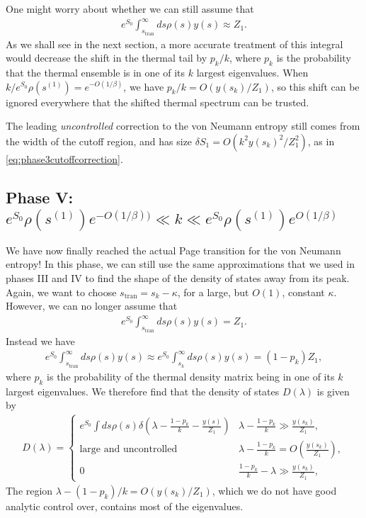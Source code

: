 \documentclass[11pt]{article}
\newcommand{\stran}{s_{\text{tran}}}
\newcommand{\smax}{s_k}
\numberwithin{equation}{section}
\begin{document}
One might worry about whether we can still assume that
\begin{align}
e^{S_0} \int_{\stran}^\infty ds \rho(s) y(s) \approx Z_1.
\end{align}
As we shall see in the next section, a more accurate treatment of this integral would decrease the shift in the thermal tail by $p_k/ k$, where $p_k$ is the probability that the thermal ensemble is in one of its $k$ largest eigenvalues. When $k/e^{S_0} \rho( s^{(1)}) = e^{-O(1/\beta)}$, we have $p_k/k = O( y(\smax)/Z_1)$, so this shift can be ignored everywhere that the shifted thermal spectrum can be trusted.

The leading \emph{uncontrolled} correction to the von Neumann entropy still comes from the width of the cutoff region, and has size $\delta S_1 =  O(k^2 y(\smax)^2/Z_1^2)$, as in \eqref{eq:phase3cutoffcorrection}.

\subsection*{Phase V: $e^{S_0} \rho( s^{(1)})e^{-O(1/\beta))} \ll k \ll e^{S_0} \rho( s^{(1)}) e^{O(1/\beta)}$}
We have now finally reached the actual Page transition for the von Neumann entropy! In this phase, we can still use the same approximations that we used in phases III and IV to find the shape of the density of states away from its peak. Again, we want to choose $\stran = \smax - \kappa$, for a large, but $O(1)$, constant $\kappa$. However, we can no longer assume that
\begin{align}
e^{S_0} \int_{\stran}^\infty ds \rho(s) y(s) = Z_1.
\end{align}
Instead we have
\begin{align}
e^{S_0} \int_{\stran}^\infty ds \rho(s) y(s) \approx e^{S_0} \int_{\smax}^\infty ds \rho(s) y(s) = (1 - p_k) Z_1,
\end{align}
where $p_k$ is the probability of the thermal density matrix being in one of its $k$ largest eigenvalues. We therefore find that the density of states $D(\lambda)$ is given by
\begin{align}
D(\lambda) = \begin{cases} 
      e^{S_0} \int ds \rho(s) \delta( \lambda - \frac{1-p_k}{k} - \frac{y(s)}{ Z_1}) & \lambda -\frac{1-p_k}{k} \gg \frac{y(\smax)}{Z_1}, \\
      \text{large and uncontrolled} & \lambda -\frac{1-p_k}{k} = O( \frac{y(\smax)}{Z_1}) ,\\
      0 &  \frac{1-p_k}{k} - \lambda \gg \frac{y(\smax)}{Z_1},
   \end{cases}
\end{align}
The region $\lambda - (1-p_k)/k = O( y(\smax)/Z_1)$, which we do not have good analytic control over, contains most of the eigenvalues. 
\end{document}
